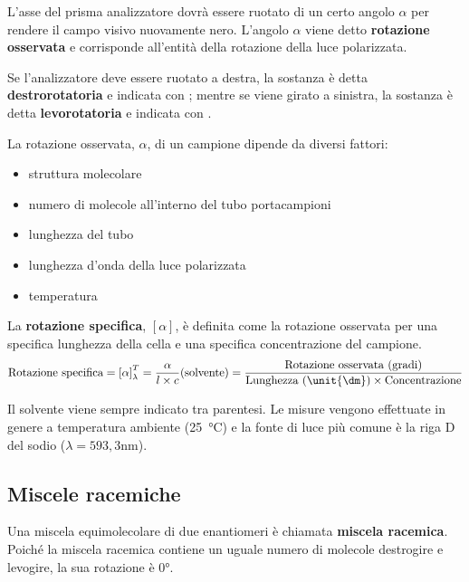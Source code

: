 L'asse del prisma analizzatore dovrà essere ruotato di un certo angolo \(\alpha\) per rendere il campo visivo nuovamente nero.
L'angolo \(\alpha\) viene detto \textbf{rotazione osservata} e corrisponde all'entità della rotazione della luce polarizzata.

Se l'analizzatore deve essere ruotato a destra, la sostanza è detta \textbf{destrorotatoria} e indicata con \iupac{(+)}; mentre se viene girato a sinistra, la sostanza è detta \textbf{levorotatoria} e indicata con \iupac{($-$)}.


La rotazione osservata, \(\alpha\), di un campione dipende da diversi fattori:
\begin{itemize}
	\item struttura molecolare
	\item numero di molecole all'interno del tubo portacampioni
	\item lunghezza del tubo
	\item lunghezza d'onda della luce polarizzata
	\item temperatura
\end{itemize}

La \textbf{rotazione specifica}, \(\left[\alpha\right]\), è definita come la rotazione osservata per una specifica lunghezza della cella e una specifica concentrazione del campione.
\begin{equation*}
	\text{Rotazione specifica} = \left[\alpha\right]^{T}_{\lambda} = \frac{\alpha}{l\times c} (\text{solvente}) = \frac{\text{Rotazione osservata (gradi)}}{\text{Lunghezza (\unit{\dm})} \times \text{Concentrazione}}
\end{equation*}

Il solvente viene sempre indicato tra parentesi. Le misure vengono effettuate in genere a temperatura ambiente (\unit{25\celsius}) e la fonte di luce più comune è la riga D del sodio (\(\lambda = \unit{593,3\nm}\)).


\subsection{Miscele racemiche}
Una miscela equimolecolare di due enantiomeri è chiamata \textbf{miscela racemica}. Poiché la miscela racemica contiene un uguale numero di molecole destrogire e levogire, la sua rotazione è \ang{0}.